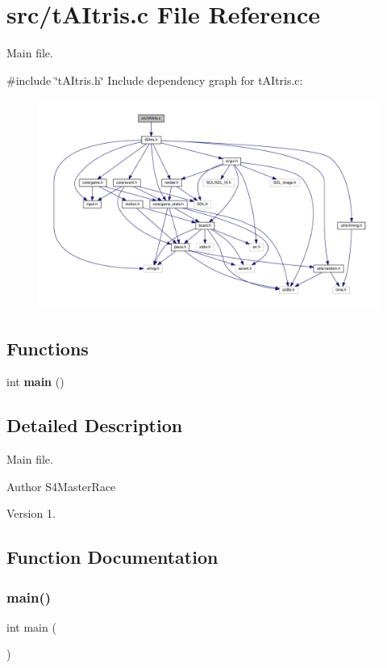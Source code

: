 \section{src/t\+A\+Itris.c File Reference}
\label{tAItris_8c}


Main file.  


{\ttfamily \#include \char`\"{}t\+A\+Itris.\+h\char`\"{}}\newline
Include dependency graph for t\+A\+Itris.\+c\+:
\nopagebreak
\begin{figure}[H]
\begin{center}
\leavevmode
\includegraphics[width=350pt]{tAItris_8c__incl}
\end{center}
\end{figure}
\subsection*{Functions}
\begin{DoxyCompactItemize}
\item 
int \textbf{ main} ()
\end{DoxyCompactItemize}


\subsection{Detailed Description}
Main file. 

\begin{DoxyAuthor}{Author}
S4\+Master\+Race 
\end{DoxyAuthor}
\begin{DoxyVersion}{Version}
1. 
\end{DoxyVersion}


\subsection{Function Documentation}
\mbox{\label{tAItris_8c_ae66f6b31b5ad750f1fe042a706a4e3d4}} 
\subsubsection{main()}
{\footnotesize\ttfamily int main (\begin{DoxyParamCaption}{ }\end{DoxyParamCaption})}

